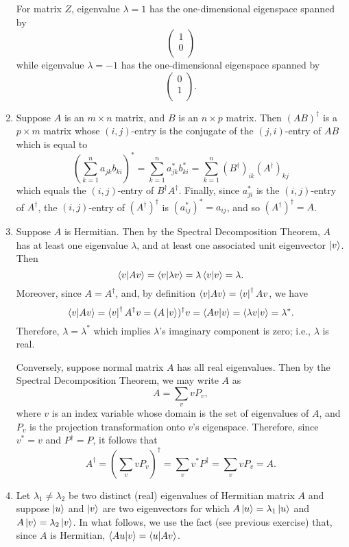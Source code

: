 \documentclass [12pt]{article}
\theoremstyle{definition}
\begin{document}
\begin{enumerate}
For matrix $Z$, eigenvalue $\lambda = 1$ has the one-dimensional eigenspace spanned by 
\[
\left(\begin{array}{c}
1\\
0\\
\end{array}\right)\]
while eigenvalue $\lambda = -1$ has the one-dimensional eigenspace spanned by 
\[
\left(\begin{array}{c}
0\\
1\\
\end{array}\right).\]


\item Suppose $A$ is an $m\times n$ matrix, and $B$ is an $n\times p$ matrix. Then $(AB)^{\dagger}$ is a $p\times m$ matrix whose $(i,j)$-entry is the conjugate
of the $(j,i)$-entry of $AB$ which is equal to 
\[(\sum_{k=1}^n a_{jk}b_{ki})^{*}= \sum_{k=1}^n a_{jk}^*b_{ki}^* = \sum_{k=1}^n (B^{\dagger})_{ik}(A^{\dagger})_{kj}\]
which equals the $(i,j)$-entry of $B^{\dagger}A^{\dagger}$. Finally, since $a_{ji}^*$ is the $(i,j)$-entry of $A^{\dagger}$, the $(i,j)$-entry of $(A^\dagger)^{\dagger}$
is $(a_{ij}^*)^* = a_{ij}$, and so $(A^\dagger)^{\dagger}=A$.

\item  Suppose $A$ is Hermitian. Then by the Spectral Decomposition Theorem, $A$ has at least one eigenvalue $\lambda$, and at least one associated unit eigenvector $\ket{v}$. Then
\[\braket{v|A v} = \braket{v|\lambda v} = \lambda \braket{v|v} = \lambda.\]
Moreover, since $A=A^\dagger$, and, by definition $\braket{v|A v}=\bra{v}^{\dagger}Av$, we have
\[\braket{v|A v} = \bra{v}^{\dagger}A^{\dagger}v = (A\ket{v})^\dagger v = \braket{Av|v} = \braket{\lambda v|v} = \lambda^*.\]
Therefore, $\lambda = \lambda^*$ which implies $\lambda$'s imaginary component is zero; i.e., $\lambda$ is real. 

Conversely, suppose normal matrix $A$ has all real eigenvalues. Then by the Spectral Decomposition Theorem, we may write $A$ as 
\[A = \sum_{v}vP_v,\]
where $v$ is an index variable whose domain is the set of eigenvalues of $A$, and $P_v$ is the projection transformation onto $v$'s eigenspace. 
Therefore, since $v^* = v$ and $P^\dagger = P$, it follows that
\[A^\dagger = (\sum_{v}vP_v)^\dagger = \sum_vv^*P^\dagger = \sum_v vP_v = A.\]

\item Let $\lambda_1\not=\lambda_2$ be two distinct (real) eigenvalues of Hermitian matrix $A$ and suppose $\ket{u}$ and $\ket{v}$ are two eigenvectors for which
$A\ket{u}=\lambda_1\ket{u}$ and $A\ket{v}=\lambda_2\ket{v}$. In what follows, we use the fact (see previous exercise) that, since $A$ is Hermitian, $\braket{Au|v}=\braket{u|Av}$.


\end{enumerate}
\end{document}
